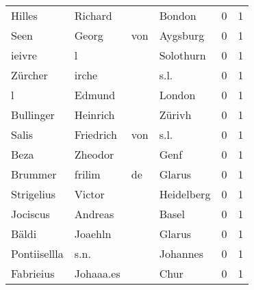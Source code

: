 \begin{center}
\begin{tiny}
\begin{longtabu}{llllrr}
                   Hilles &                            Richard &             &                                      Bondon &          0 &         1 \\
                     Seen &                              Georg &         von &                                    Aygsburg &          0 &         1 \\
                   ieivre &                                  l &             &                                   Solothurn &          0 &         1 \\
                  Zürcher &                              irche &             &                                        s.l. &          0 &         1 \\
                        l &                             Edmund &             &                                      London &          0 &         1 \\
                Bullinger &                           Heinrich &             &                                      Zürivh &          0 &         1 \\
                    Salis &                          Friedrich &         von &                                        s.l. &          0 &         1 \\
                     Beza &                            Zheodor &             &                                        Genf &          0 &         1 \\
                  Brummer &                             frilim &          de &                                      Glarus &          0 &         1 \\
               Strigelius &                             Victor &             &                                  Heidelberg &          0 &         1 \\
                 Jociscus &                            Andreas &             &                                       Basel &          0 &         1 \\
                    Bäldi &                            Joaehln &             &                                      Glarus &          0 &         1 \\
             Pontiisellla &                               s.n. &             &                                    Johannes &          0 &         1 \\
                Fabrieius &                          Johaaa.es &             &                                        Chur &          0 &         1 \\

\end{longtabu}
\end{tiny}
\end{center}
